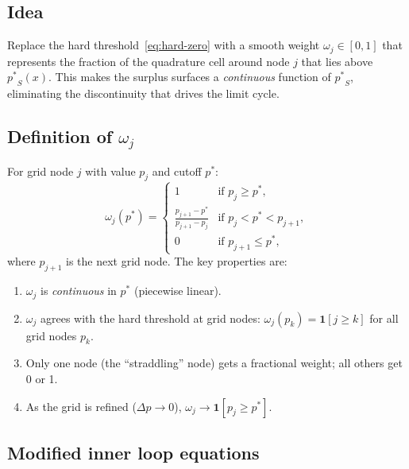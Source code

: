 \documentclass[11pt,a4paper]{article}
\newcommand{\pstar}{\mathord{p^{*}}}
\theoremstyle{definition}
\begin{document}
\subsection{Idea}

Replace the hard threshold~\eqref{eq:hard-zero} with a smooth weight
$\omega_j \in [0,1]$ that represents the fraction of the quadrature cell
around node $j$ that lies above $\pstar_S(x)$.  This makes the surplus
surfaces a \emph{continuous} function of $\pstar_S$, eliminating the
discontinuity that drives the limit cycle.

\subsection{Definition of $\omega_j$}

For grid node $j$ with value $p_j$ and cutoff $\pstar$:
%
\begin{equation}
    \omega_j(\pstar) =
    \begin{cases}
        1 & \text{if } p_j \geq \pstar, \\[4pt]
        \displaystyle\frac{p_{j+1} - \pstar}{p_{j+1} - p_j}
          & \text{if } p_j < \pstar < p_{j+1}, \\[8pt]
        0 & \text{if } p_{j+1} \leq \pstar,
    \end{cases}
    \label{eq:soft-weight}
\end{equation}
%
where $p_{j+1}$ is the next grid node.  The key properties are:
%
\begin{enumerate}[label=(\roman*)]
    \item $\omega_j$ is \emph{continuous} in $\pstar$ (piecewise linear).
    \item $\omega_j$ agrees with the hard threshold at grid nodes:
          $\omega_j(p_k) = \mathbf{1}[j \geq k]$ for all grid nodes $p_k$.
    \item Only one node (the ``straddling'' node) gets a fractional weight;
          all others get 0 or 1.
    \item As the grid is refined ($\Delta p \to 0$),
          $\omega_j \to \mathbf{1}[p_j \geq \pstar]$.
\end{enumerate}

\subsection{Modified inner loop equations}
\end{document}
